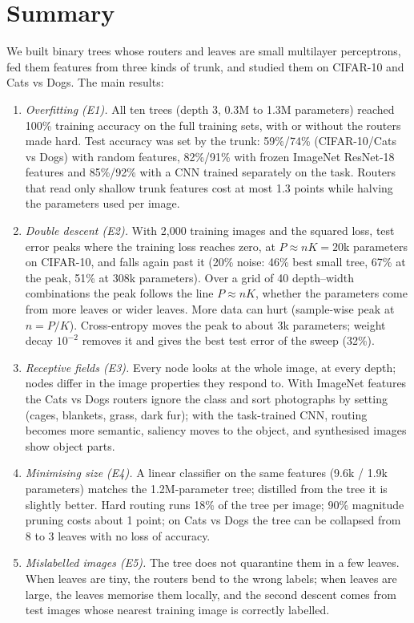 \section*{Summary}
We built binary trees whose routers and leaves are small multilayer perceptrons, fed them features from three kinds of trunk, and studied them on CIFAR-10 and Cats vs Dogs. The main results:
\begin{enumerate}
\item \emph{Overfitting (E1).} All ten trees (depth 3, 0.3M to 1.3M parameters) reached 100\% training accuracy on the full training sets, with or without the routers made hard. Test accuracy was set by the trunk: 59\%/74\% (CIFAR-10/Cats vs Dogs) with random features, 82\%/91\% with frozen ImageNet ResNet-18 features and 85\%/92\% with a CNN trained separately on the task. Routers that read only shallow trunk features cost at most 1.3 points while halving the parameters used per image.
\item \emph{Double descent (E2).} With 2{,}000 training images and the squared loss, test error peaks where the training loss reaches zero, at $P\approx nK=20$k parameters on CIFAR-10, and falls again past it (20\% noise: 46\% best small tree, 67\% at the peak, 51\% at 308k parameters). Over a grid of 40 depth--width combinations the peak follows the line $P\approx nK$, whether the parameters come from more leaves or wider leaves. More data can hurt (sample-wise peak at $n=P/K$). Cross-entropy moves the peak to about 3k parameters; weight decay $10^{-2}$ removes it and gives the best test error of the sweep (32\%).
\item \emph{Receptive fields (E3).} Every node looks at the whole image, at every depth; nodes differ in the image properties they respond to. With ImageNet features the Cats vs Dogs routers ignore the class and sort photographs by setting (cages, blankets, grass, dark fur); with the task-trained CNN, routing becomes more semantic, saliency moves to the object, and synthesised images show object parts.
\item \emph{Minimising size (E4).} A linear classifier on the same features (9.6k / 1.9k parameters) matches the 1.2M-parameter tree; distilled from the tree it is slightly better. Hard routing runs 18\% of the tree per image; 90\% magnitude pruning costs about 1 point; on Cats vs Dogs the tree can be collapsed from 8 to 3 leaves with no loss of accuracy.
\item \emph{Mislabelled images (E5).} The tree does not quarantine them in a few leaves. When leaves are tiny, the routers bend to the wrong labels; when leaves are large, the leaves memorise them locally, and the second descent comes from test images whose nearest training image is correctly labelled.
\end{enumerate}

